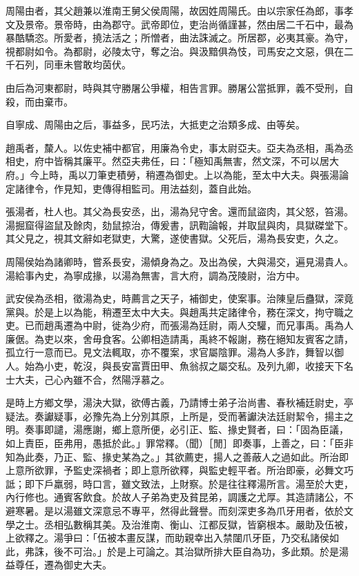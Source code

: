 \begin{pinyinscope}
周陽由者，其父趙兼以淮南王舅父侯周陽，故因姓周陽氏。由以宗家任為郎，事孝文及景帝。景帝時，由為郡守。武帝即位，吏治尚循謹甚，然由居二千石中，最為暴酷驕恣。所愛者，撓法活之；所憎者，曲法誅滅之。所居郡，必夷其豪。為守，視都尉如令。為都尉，必陵太守，奪之治。與汲黯俱為忮，司馬安之文惡，俱在二千石列，同車未嘗敢均茵伏。

由后為河東都尉，時與其守勝屠公爭權，相告言罪。勝屠公當抵罪，義不受刑，自殺，而由棄市。

自寧成、周陽由之后，事益多，民巧法，大抵吏之治類多成、由等矣。

趙禹者，斄人。以佐史補中都官，用廉為令史，事太尉亞夫。亞夫為丞相，禹為丞相史，府中皆稱其廉平。然亞夫弗任，曰：「極知禹無害，然文深，不可以居大府。」今上時，禹以刀筆吏積勞，稍遷為御史。上以為能，至太中大夫。與張湯論定諸律令，作見知，吏傳得相監司。用法益刻，蓋自此始。

張湯者，杜人也。其父為長安丞，出，湯為兒守舍。還而鼠盜肉，其父怒，笞湯。湯掘窟得盜鼠及餘肉，劾鼠掠治，傳爰書，訊鞫論報，并取鼠與肉，具獄磔堂下。其父見之，視其文辭如老獄吏，大驚，遂使書獄。父死后，湯為長安吏，久之。

周陽侯始為諸卿時，嘗系長安，湯傾身為之。及出為侯，大與湯交，遍見湯貴人。湯給事內史，為寧成掾，以湯為無害，言大府，調為茂陵尉，治方中。

武安侯為丞相，徵湯為史，時薦言之天子，補御史，使案事。治陳皇后蠱獄，深竟黨與。於是上以為能，稍遷至太中大夫。與趙禹共定諸律令，務在深文，拘守職之吏。已而趙禹遷為中尉，徙為少府，而張湯為廷尉，兩人交驩，而兄事禹。禹為人廉倨。為吏以來，舍毋食客。公卿相造請禹，禹終不報謝，務在絕知友賓客之請，孤立行一意而已。見文法輒取，亦不覆案，求官屬陰罪。湯為人多詐，舞智以御人。始為小吏，乾沒，與長安富賈田甲、魚翁叔之屬交私。及列九卿，收接天下名士大夫，己心內雖不合，然陽浮慕之。

是時上方鄉文學，湯決大獄，欲傅古義，乃請博士弟子治尚書、春秋補廷尉史，亭疑法。奏讞疑事，必豫先為上分別其原，上所是，受而著讞決法廷尉絜令，揚主之明。奏事即譴，湯應謝，鄉上意所便，必引正、監、掾史賢者，曰：「固為臣議，如上責臣，臣弗用，愚抵於此。」罪常釋。（聞）［閒］即奏事，上善之，曰：「臣非知為此奏，乃正、監、掾史某為之。」其欲薦吏，揚人之善蔽人之過如此。所治即上意所欲罪，予監史深禍者；即上意所欲釋，與監史輕平者。所治即豪，必舞文巧詆；即下戶羸弱，時口言，雖文致法，上財察。於是往往釋湯所言。湯至於大吏，內行修也。通賓客飲食。於故人子弟為吏及貧昆弟，調護之尤厚。其造請諸公，不避寒暑。是以湯雖文深意忌不專平，然得此聲譽。而刻深吏多為爪牙用者，依於文學之士。丞相弘數稱其美。及治淮南、衡山、江都反獄，皆窮根本。嚴助及伍被，上欲釋之。湯爭曰：「伍被本畫反謀，而助親幸出入禁闥爪牙臣，乃交私諸侯如此，弗誅，後不可治。」於是上可論之。其治獄所排大臣自為功，多此類。於是湯益尊任，遷為御史大夫。


\end{pinyinscope}
